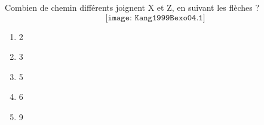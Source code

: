 Combien de chemin différents joignent X et Z, en suivant les flèches ?
\[\texttt{[image: Kang1999Bexo04.1]}\]
\begin{multicols}{5}
  \begin{enumerate}[A/]
  \item 2
  \item 3
  \item 5
  \item 6
  \item 9
  \end{enumerate}
\end{multicols}